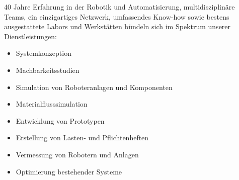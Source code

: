 40 Jahre Erfahrung in der Robotik und Automatisierung, multidisziplinäre Teams, ein einzigartiges Netzwerk, umfassendes Know-how sowie bestens ausgestattete Labors und Werkstätten bündeln
sich im Spektrum unserer Dienstleistungen:
\begin{itemize}
    \item Systemkonzeption
    \item Machbarkeitsstudien
    \item Simulation von Roboteranlagen und Komponenten
    \item Materialflusssimulation
    \item Entwicklung von Prototypen
    \item Erstellung von Lasten- und Pflichtenheften
    \item Vermessung von Robotern und Anlagen
    \item Optimierung bestehender Systeme
\end{itemize}